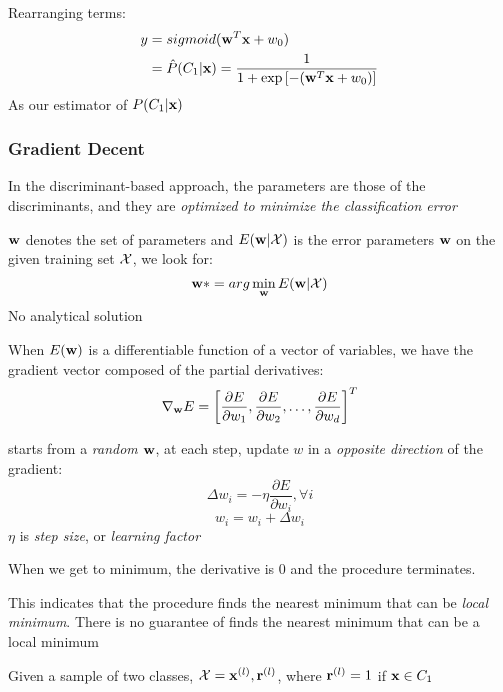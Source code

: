        Rearranging terms: 
        \begin{align*} y  & = sigmoid(\mathbf{w}^T\mathbf{x} + w_0) \\
            & =  \hat{P}(C_1|\mathbf{x}) = \frac{1}{1 + \exp\left[-(\mathbf{w}^T\mathbf{x} + w_0 )\right]}
        \end{align*}
        As our estimator of $P(C_1|\mathbf{x})$

        \subsubsection{Gradient Decent}
    In the discriminant-based approach, the parameters are those of the
        discriminants, and they are \emph{optimized to minimize the
        classification error}
        \begin{description}
    \item[Error]$\mathbf{w}$ denotes the set of parameters and $E(\mathbf{w}|\mathcal{X})$ is the
        error parameters $\mathbf{w}$ on the given training set 
        $\mathcal{X}$, we look for: 
        \[ \mathbf{w}*= arg\min_{\mathbf{w}}E(\mathbf{w}|\mathcal{X})\]
        No analytical solution
    \item[Gradient Vector] When $E(\mathbf{w})$ is a differentiable function of a
        vector of variables, we have the gradient vector composed of the
           partial derivatives:
            \[ \nabla_{\mathbf{w}} E = \left[ \frac{\partial E}{\partial w_1},
                \frac{\partial E}{\partial w_2}, \dots, \frac{\partial
                E}{\partial w_d} \right]^T
                \]
            \item [Gradient Descent] starts from a \emph{random} $\mathbf{w}$, at each
                step, update $w$ in a \emph{opposite direction} of the gradient:
                \[\Delta w_i = - \eta\frac{\partial E}{\partial w_i}, \forall i
                    \]
                \[ w_i = w_i + \Delta w_i \]
                $\eta$ is \emph{step size}, or \emph{learning factor}

                When we get to minimum, the derivative is 0 and the procedure
                terminates.

            \item This indicates that the procedure finds the nearest minimum
                that can be \emph{local minimum}. There is no guarantee of
                finds the nearest minimum that can be a local minimum
    \item [Learning parameters]
        Given a sample of two classes, $\mathcal{X} = {\mathbf{x}^{(l)}, \mathbf{r}^{(l)}}$, where $\mathbf{r}^{(l)}
        = 1$ if $\mathbf{x}\in C_1$


\end{description}
